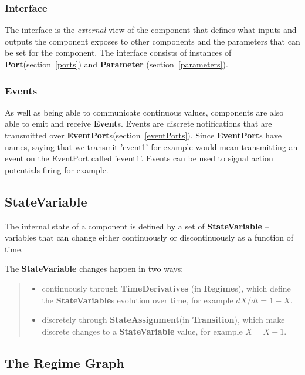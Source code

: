\documentclass{article}
\newcommand{\StateVariable}{{\bf{StateVariable}}\xspace}
\newcommand{\StateVariables}{{\bf{StateVariable}}s\xspace}
\newcommand{\StateAssignment}{{\bf{StateAssignment}}\xspace}
\newcommand{\EventPorts}{{\bf{EventPort}}s\xspace}
\newcommand{\Port}{{\bf{Port}}\xspace}
\newcommand{\Events}{{\bf{Event}}s\xspace}
\newcommand{\Regimes}{{\bf{Regime}}s\xspace}
\newcommand{\Transition}{{\bf{Transition}}\xspace}
\newcommand{\Parameter}{{\bf{Parameter}}\xspace}
\begin{document}
\subsubsection{Interface}

The interface is the \emph{external} view of the component that defines
what inputs and outputs the component exposes to other components and the
parameters that can be set for the component. The interface consists of
instances of \Port (section~\ref{ports}) and \Parameter
(section~\ref{parameters}).

\subsubsection{Events}
\label{events}

As well as being able to communicate continuous values, components are also
able to emit and receive \Events. Events are discrete notifications
that are transmitted over \EventPorts (section~\ref{eventPorts}). Since
\EventPorts have names, saying that we transmit 'event1' for example
would mean transmitting an event on the EventPort called 'event1'. Events
can be used to signal action potentials firing for example.

\subsection{StateVariable}
\label{state-var}

The internal state of a component is defined by a set of \StateVariable
-- variables that can change either continuously or discontinuously as a
function of time.

The \StateVariable changes happen in two ways:
%
\begin{quote}
\begin{itemize}
\item continuously through \textbf{TimeDerivatives} (in \Regimes),
which define the \StateVariables evolution over time, for example
$dX/dt=1-X$.
\item discretely through \StateAssignment (in \Transition),
which make discrete changes to a \StateVariable value, for example
$X = X + 1$.
\end{itemize}
\end{quote}

\subsection{The Regime Graph}
\label{regime-graph}
\end{document}
